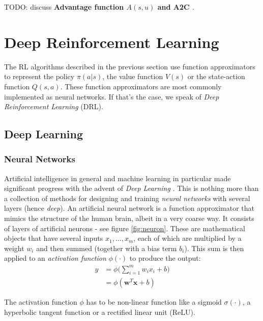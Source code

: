 TODO: discuss \textbf{Advantage function $A(s,u)$ and A2C \cite{mnih2013playing}}.


\section{Deep Reinforcement Learning}
\label{sec:intro_deep_rl}
The RL algorithms described in the previous section use function approximators to represent the policy $\pi(a|s)$, the value function $V(s)$ or the state-action function $Q(s,a)$. These function approximators are most commonly implemented as neural networks. If that's the case, we speak of \emph{Deep Reinforcement Learning} (DRL).

\subsection{Deep Learning}
\label{sec:deep_learning}

\subsubsection{Neural Networks}
Artificial intelligence in general and machine learning in particular made significant progress with the advent of \emph{Deep Learning} \cite{goodfellow2016deep}. This is nothing more than a collection of methods for designing and training \emph{neural networks} with several layers (hence \emph{deep}). An artificial neural network is a function approximator that mimics the structure of the human brain, albeit in a very coarse way. It consists of layers of artificial neurons - see figure \ref{fig:neuron}. These are mathematical objects that have several inputs $x_1, \ldots, x_m$, each of which are multiplied by a weight $w_i$ and then summed (together with a bias term $b_i$). This sum is then applied to an \emph{activation function} $\phi(\cdot)$ to produce the output:
\begin{equation}
    \begin{split}
    y &= \phi \Big (\sum_{i=1}^{m}w_i x_i + b \Big) \\
      &= \phi (\bm{w}^T \bm{x} + b) 
    \end{split}
\end{equation}

The activation function $\phi$ has to be non-linear function like a sigmoid $\sigma(\cdot)$, a hyperbolic tangent function or a rectified linear unit (ReLU).\\

